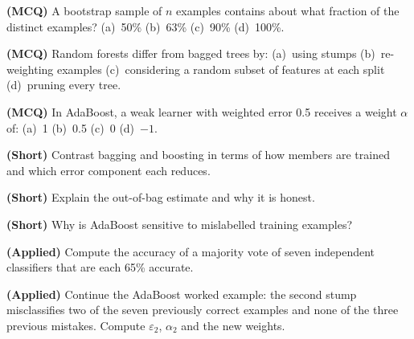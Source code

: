 \begin{reviewq}
  \item \textbf{(MCQ)} A bootstrap sample of $n$ examples contains about what
        fraction of the distinct examples? (a)~50\% (b)~63\% (c)~90\% (d)~100\%.
  \item \textbf{(MCQ)} Random forests differ from bagged trees by: (a)~using stumps
        (b)~re-weighting examples (c)~considering a random subset of features at
        each split (d)~pruning every tree.
  \item \textbf{(MCQ)} In AdaBoost, a weak learner with weighted error 0.5 receives
        a weight $\alpha$ of: (a)~1 (b)~0.5 (c)~0 (d)~$-1$.
  \item \textbf{(Short)} Contrast bagging and boosting in terms of how members are
        trained and which error component each reduces.
  \item \textbf{(Short)} Explain the out-of-bag estimate and why it is honest.
  \item \textbf{(Short)} Why is AdaBoost sensitive to mislabelled training examples?
  \item \textbf{(Applied)} Compute the accuracy of a majority vote of seven
        independent classifiers that are each 65\% accurate.
  \item \textbf{(Applied)} Continue the AdaBoost worked example: the second stump
        misclassifies two of the seven previously correct examples and none of the
        three previous mistakes. Compute $\varepsilon_2$, $\alpha_2$ and the new
        weights.
\end{reviewq}

